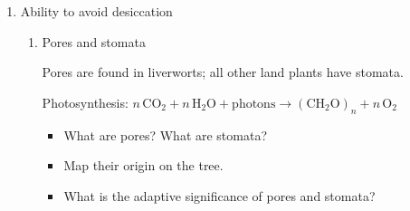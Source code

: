\begin{frame}[t]
    \begin{adjustwidth}{-2em}{-1.5em}

        \begin{enumerate}
            \item Ability to avoid desiccation
            \begin{enumerate}
                \addtocounter{enumii}{1}
                \item Pores and stomata

                    \vspace{2mm}
                    Pores are found in liverworts; all other land plants have
                    stomata.

                    \vspace{2mm}
                    Photosynthesis: $n \,\textrm{CO}_2 + n \,\textrm{H}_2\textrm{O} + \textrm{photons} \rightarrow (\textrm{CH}_2\textrm{O})_n + n \,\textrm{O}_2$
                
                \begin{itemize}
                    \item What are pores? What are stomata?


                    \vspace{5mm}
                    \item Map their origin on the tree.


                    \vspace{5mm}
                    \item What is the adaptive significance of pores and stomata?


                \end{itemize}
            \end{enumerate}
        \end{enumerate}
    \end{adjustwidth}
\end{frame}

